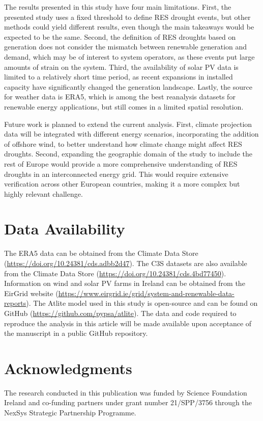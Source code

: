 \documentclass[preprint, 12pt]{elsarticle}
\begin{document}
The results presented in this study have four main limitations. First, the presented study uses a fixed threshold to define RES drought events, but other methods could yield different results, even though the main takeaways would be expected to be the same. Second, the definition of RES droughts based on generation does not consider the mismatch between renewable generation and demand, which may be of interest to system operators, as these events put large amounts of strain on the system. Third, the availability of solar PV data is limited to a relatively short time period, as recent expansions in installed capacity have significantly changed the generation landscape. Lastly, the source for weather data is ERA5, which is among the best reanalysis datasets for renewable energy applications, but still comes in a limited spatial resolution. 

Future work is planned to extend the current analysis. First, climate projection data will be integrated with different energy scenarios, incorporating the addition of offshore wind, to better understand how climate change might affect RES droughts. Second, expanding the geographic domain of the study to include the rest of Europe would provide a more comprehensive understanding of RES droughts in an interconnected energy grid. This would require extensive verification across other European countries, making it a more complex but highly relevant challenge.

\section*{Data Availability}

The ERA5 data can be obtained from the Climate Data Store (\url{https://doi.org/10.24381/cds.adbb2d47}). The C3S datasets are also available from the Climate Data Store (\url{https://doi.org/10.24381/cds.4bd77450}). Information on wind and solar PV farms in Ireland can be obtained from the EirGrid website (\url{https://www.eirgrid.ie/grid/system-and-renewable-data-reports}). The Atlite model used in this study is open-source and can be found on GitHub (\url{https://github.com/pypsa/atlite}). The data and code required to reproduce the analysis in this article will be made available upon acceptance of the manuscript in a public GitHub repository.

\section*{Acknowledgments}

The research conducted in this publication was funded by Science Foundation Ireland and co-funding partners under grant number 21/SPP/3756 through the NexSys Strategic Partnership Programme.



\end{document}
